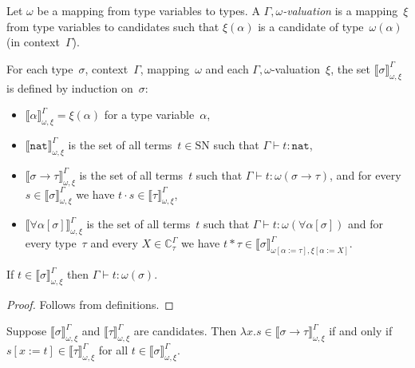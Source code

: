 \documentclass[runningheads,a4paper]{llncs}
\newcommand{\abs}[2]{\lambda #1.#2}
\newcommand{\app}[2]{#1 \cdot #2}
\newcommand{\tapp}[2]{#1 * #2}
\newcommand{\subst}[2]{#1:=#2}
\newcommand{\nat}{\mathtt{nat}}
\newcommand{\SN}{\mathrm{SN}}
\newcommand{\Cb}{\mathbb{C}}
\newcommand{\val}[3]{\ensuremath{\llbracket#1\rrbracket_{#2}^{#3}}}
\newcommand{\proves}{\vdash}
\begin{document}
\begin{definition}\label{def_reducibility_valuation}
  Let $\omega$ be a mapping from type variables to types. A
  \emph{$\Gamma,\omega$-valuation} is a mapping~$\xi$ from type
  variables to candidates such that $\xi(\alpha)$ is a candidate of
  type~$\omega(\alpha)$ (in context~$\Gamma$).

  For each type~$\sigma$, context~$\Gamma$, mapping~$\omega$
  and each $\Gamma,\omega$-valuation~$\xi$, the set $\val{\sigma}{\omega,\xi}{\Gamma}$ is
  defined by induction on~$\sigma$:
  \begin{itemize}
  \item $\val{\alpha}{\omega,\xi}{\Gamma} = \xi(\alpha)$ for a type
    variable~$\alpha$,
  \item $\val{\nat}{\omega,\xi}{\Gamma}$ is the set of all
    terms~$t \in \SN$ such that $\Gamma \proves t : \nat$,
  \item $\val{\sigma \to \tau}{\omega,\xi}{\Gamma}$ is the set of all
    terms~$t$ such that $\Gamma \proves t : \omega(\sigma \to \tau)$,
    and for every~$s \in \val{\sigma}{\omega,\xi}{\Gamma}$ we have
    $\app{t}{s} \in \val{\tau}{\omega,\xi}{\Gamma}$,
  \item $\val{\forall\alpha[\sigma]}{\omega,\xi}{\Gamma}$ is the set
    of all terms~$t$ such that
    $\Gamma \proves t : \omega(\forall\alpha[\sigma])$ and for every
    type~$\tau$ and every $X \in \Cb_\tau^\Gamma$ we have
    $\tapp{t}{\tau} \in \val{\sigma}{\omega[\subst{\alpha}{\tau}],
    \xi[\subst{\alpha}{X}]}{\Gamma}$.
  \end{itemize}
\end{definition}

\begin{lemma}\label{lem_val_typable}
  If $t \in \val{\sigma}{\omega,\xi}{\Gamma}$ then
  $\Gamma \proves t : \omega(\sigma)$.
\end{lemma}

\begin{proof}
  Follows from definitions.
\end{proof}

\begin{lemma}\label{lem_abstraction_computability}
Suppose $\val{\sigma}{\omega,\xi}{\Gamma}$ and $\val{\tau}{\omega,\xi}{
\Gamma}$ are candidates.
Then $\abs{x}{s} \in \val{\sigma \to \tau}{\omega,\xi}{\Gamma}$ if and
only if $s[x:=t] \in \val{\tau}{\omega,\xi}{\Gamma}$ for all $t \in
\val{\sigma}{\omega,\xi}{\Gamma}$.
\end{lemma}
\end{document}
